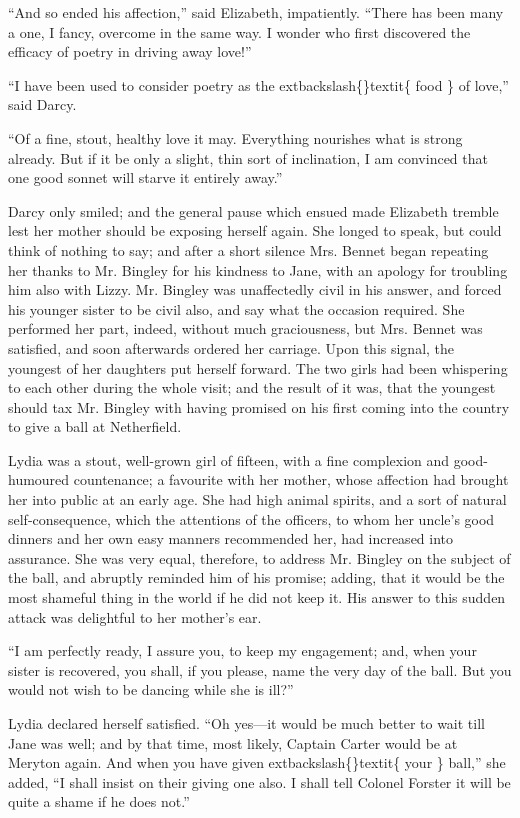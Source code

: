 \documentclass[10pt]{book}
\begin{document}
   “And so ended his affection,” said Elizabeth, impatiently. “There has
been many a one, I fancy, overcome in the same way. I wonder who first
discovered the efficacy of poetry in driving away love!”
  

   “I have been used to consider poetry as the
   	extbackslash\{\}textit\{
    food
   \}
   of love,” said Darcy.
  

   “Of a fine, stout, healthy love it may. Everything nourishes what is
strong already. But if it be only a slight, thin sort of inclination, I
am convinced that one good sonnet will starve it entirely away.”
  

   Darcy only smiled; and the general pause which ensued made Elizabeth
tremble lest her mother should be exposing herself again. She longed to
speak, but could think of nothing to say; and after a short silence Mrs.
Bennet began repeating her thanks to Mr. Bingley for his kindness to
Jane, with an apology for troubling him also with Lizzy. Mr. Bingley was
unaffectedly civil in his answer, and forced his younger sister to be
civil also, and say what the occasion required. She performed her part,
indeed, without much graciousness, but Mrs. Bennet was satisfied, and
soon afterwards ordered her carriage. Upon this signal, the youngest of
her daughters put herself forward. The two girls had been whispering to
each other during the whole visit; and the result of it was, that the
youngest should tax Mr. Bingley with having promised on his first coming
into the country to give a ball at Netherfield.
  

   Lydia was a stout, well-grown girl of fifteen, with a fine complexion
and good-humoured countenance; a favourite with her mother, whose
affection had brought her into public at an early age. She had high
animal spirits, and a sort of natural self-consequence, which the
attentions of the officers, to whom her uncle’s good
   dinners and her
own easy manners recommended her, had increased into assurance. She was
very equal, therefore, to address Mr. Bingley on the subject of the
ball, and abruptly reminded him of his promise; adding, that it would be
the most shameful thing in the world if he did not keep it. His answer
to this sudden attack was delightful to her mother’s ear.
  

   “I am perfectly ready, I assure you, to keep my engagement; and, when
your sister is recovered, you shall, if you please, name the very day of
the ball. But you would not wish to be dancing while she is ill?”
  

   Lydia declared herself satisfied. “Oh yes—it would be much better to
wait till Jane was well; and by that time, most likely, Captain Carter
would be at Meryton again. And when you have given
   	extbackslash\{\}textit\{
    your
   \}
   ball,” she
added, “I shall insist on their giving one also. I shall tell Colonel
Forster it will be quite a shame if he does not.”
  
\end{document}
